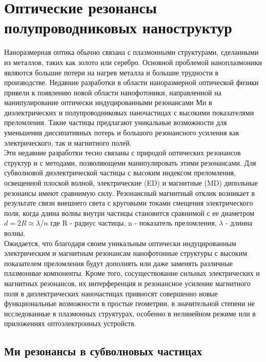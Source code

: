 \section{Оптические резонансы полупроводниковых наноструктур}
\hspace*{2mm}
Наноразмерная оптика обычно связана с плазмонными структурами, сделанными из металлов, таких как золото или серебро. Основной проблемой наноплазмоники являются большие потери на нагрев металла и большие трудности в производстве. Недавние разработки в области наноразмерной оптической физики привели к появлению новой области нанофотоники, направленной на манипулирование оптически индуцированными резонансами Ми в диэлектрических и полупроводниковых наночастицах с высокими показателями преломления. Такие частицы предлагают уникальные возможности для уменьшения диссипативных потерь и большого резонансного усиления как электрического, так и магнитного полей. 
\\
\hspace*{2mm}
Эти недавние разработки тесно связаны с природой оптических резонансов структур и с методами, позволяющеми манипулировать этими резонансами. Для субволновой диэлектрической частицы с высоким индексом преломления, освещенной плоской волной, электрические (ED) и магнитные (MD) дипольные резонансы имеют сравнимую силу. Резонансный магнитный отклик возникает в результате связи внешнего света с круговыми токами смещения электрического поля, когда длина волны внутри частицы становится сравнимой с ее диаметром $d = 2R \approx \lambda/n$ где R - радиус частицы, n - показатель преломления, $\lambda$ - длинна волны.
\\
\hspace*{2mm}
Ожидается, что благодаря своим уникальным оптически индуцированным электрическим и магнитным резонансам нанофотонные структуры с высоким показателем преломления будут дополнять или даже заменять различные плазмонные компоненты. Кроме того, сосуществование сильных электрических и магнитных резонансов, их интерференция и резонансное усиление магнитного поля в диэлектрических наночастицах привносят совершенно новые функциональные возможности в простые геометрии, в значительной степени не исследованные в плазмонных структурах, особенно в нелинейном режиме или в приложениях оптоэлектронных устройств. 

\subsection{Ми резонансы в субволновых частицах}

